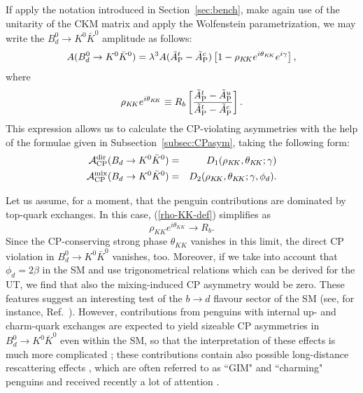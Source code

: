 \documentclass[11pt]{cernrep}
\begin{document}
If apply the notation 
introduced in Section~\ref{sec:bench}, make again use of the
unitarity of the CKM matrix and apply the Wolfenstein parametrization, 
we may write the $B^0_d\to K^0\bar K^0$ amplitude as follows:
\begin{equation}\label{ampl-BdKK-lamt}
A(B^0_d\to K^0\bar K^0)=\lambda^3A(\tilde A_{\rm P}^t-\tilde A_{\rm P}^c)
\left[1-\rho_{K\!K} e^{i\theta_{K\!K}}e^{i\gamma}\right],
\end{equation}
where 
\begin{equation}\label{rho-KK-def}
\rho_{K\!K} e^{i\theta_{K\!K}}\equiv R_b
\left[\frac{\tilde A_{\rm P}^t-\tilde A_{\rm P}^u}{\tilde A_{\rm P}^t-\tilde A_{\rm P}^c}\right].
\end{equation}
This expression allows us to calculate the CP-violating asymmetries with 
the help of the formulae given in Subsection~\ref{subsec:CPasym},
taking the following form:
\begin{eqnarray}
{\cal A}_{\rm CP}^{\rm dir}(B_d\to K^0\bar K^0)&=&
D_1(\rho_{K\!K},\theta_{K\!K};\gamma) \label{CP-BKK-dir-gen}\\
{\cal A}_{\rm CP}^{\rm mix}(B_d\to K^0\bar K^0)&=&
D_2(\rho_{K\!K},\theta_{K\!K};\gamma,\phi_d).\label{CP-BKK-mix-gen}
\end{eqnarray}

Let us assume, for a moment, that the penguin contributions are dominated 
by top-quark exchanges. In this case, (\ref{rho-KK-def}) simplifies as
\begin{equation}
\rho_{K\!K} e^{i\theta_{K\!K}} \to R_b.
\end{equation}
Since the CP-conserving strong phase $\theta_{K\!K}$ vanishes in this limit,
the direct CP violation in $B^0_d\to K^0\bar K^0$ vanishes, too. Moreover, 
if we take into account that $\phi_d=2\beta$ in the SM and use trigonometrical
relations which can be derived for the UT, we find that also the mixing-induced
CP asymmetry would be zero. These features suggest an interesting test
of the $b\to d$ flavour sector of the SM (see, for instance, Ref.\  \cite{quinn}). 
However, contributions from penguins with internal up- and charm-quark 
exchanges are expected to yield sizeable CP asymmetries in 
$B_d^0\to K^0\bar K^0$ even within the SM, so that the interpretation of these 
effects is much more complicated \cite{RF-BdKK}; these contributions 
contain also possible long-distance rescattering effects \cite{BFM},
which are often referred to as ``GIM" and ``charming" penguins and received
recently a lot of attention \cite{charming}.
\end{document}

